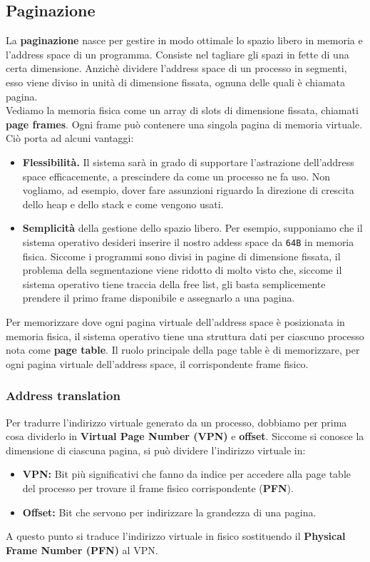 \documentclass[12pt, twoside, letterpaper]{article}
\begin{document}
		\subsection{Paginazione}
			La \textbf{paginazione} nasce per gestire in modo ottimale lo spazio libero in memoria e l'address space di un programma.
			Consiste nel tagliare gli spazi in fette di una certa dimensione. Anzichè dividere l'address space di un processo in segmenti, esso viene diviso in unità di dimensione fissata, ognuna delle quali è chiamata pagina.\\
			Vediamo la memoria fisica come un array di slots di dimensione fissata, chiamati \textbf{page frames}. Ogni frame può contenere una singola pagina di memoria virtuale. Ciò porta ad alcuni vantaggi: 
			\begin{itemize}
				\item \textbf{Flessibilità.} Il sistema sarà in grado di supportare l'astrazione dell'address space efficacemente, a prescindere da come un processo ne fa uso. Non vogliamo, ad esempio, dover fare assunzioni riguardo la direzione di crescita dello heap e dello stack e come vengono usati.
				\item \textbf{Semplicità} della gestione dello spazio libero. Per esempio, supponiamo che il sistema operativo desideri  inserire il nostro addess space da \texttt{64B} in memoria fisica. Siccome i programmi sono divisi in pagine di dimensione fissata, il problema della segmentazione viene ridotto di molto visto che, siccome il sistema operativo tiene traccia della free list, gli basta semplicemente prendere il primo frame disponibile e assegnarlo a una pagina.
			\end{itemize}
			Per memorizzare dove ogni pagina virtuale dell'address space è posizionata in memoria fisica, il sistema operativo tiene una struttura dati per  ciascuno processo nota come \textbf{page table}. Il ruolo principale della page table è di memorizzare, per ogni pagina virtuale dell'address space, il corrispondente frame fisico.	
			
			\subsubsection{Address translation}
				Per tradurre l'indirizzo virtuale generato da un processo, dobbiamo per prima cosa dividerlo in \textbf{Virtual Page Number (VPN)} e \textbf{offset}.
				Siccome si conosce la dimensione di ciascuna pagina, si può dividere l'indirizzo virtuale in:
				\begin{itemize}
					\item \textbf{VPN:} Bit più significativi che fanno da indice per accedere alla page table del processo per trovare il frame fisico corrispondente (\textbf{PFN}).
					\item \textbf{Offset:} Bit che servono per indirizzare la grandezza di una pagina.
				\end{itemize}
				A questo punto si traduce l'indirizzo virtuale in fisico sostituendo il \textbf{Physical Frame Number (PFN)} al VPN.
			
\end{document}

